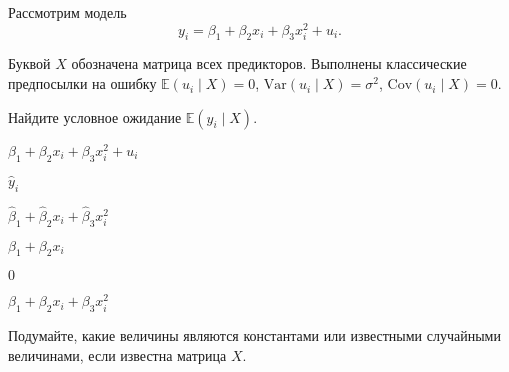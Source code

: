 
\begin{question}
Рассмотрим модель
\[
y_i = \beta_1 + \beta_2 x_i + \beta_3 x_i^2 + u_i.
\]

Буквой \(X\) обозначена матрица всех предикторов.
Выполнены классические предпосылки на ошибку \(\mathbb E(u_i \mid X) = 0\), \(\mathrm{Var}(u_i \mid X) = \sigma^2\), \(\mathrm{Cov}(u_i \mid X) = 0\).

Найдите условное ожидание \(\mathbb E(y_i \mid X)\).
\begin{answerlist}
  \item \(\beta_1 + \beta_2 x_i + \beta_3 x_i^2 + u_i\)
  \item \(\hat y_i\)
  \item \(\hat\beta_1 + \hat\beta_2 x_i + \hat\beta_3 x_i^2\)
  \item \(\beta_1 + \beta_2 x_i\)
  \item \(0\)
  \item \(\beta_1 + \beta_2 x_i + \beta_3 x_i^2\)
\end{answerlist}
\end{question}

\begin{solution}
Подумайте, какие величины являются константами или известными случайными величинами, если известна матрица \(X\).
\end{solution}

